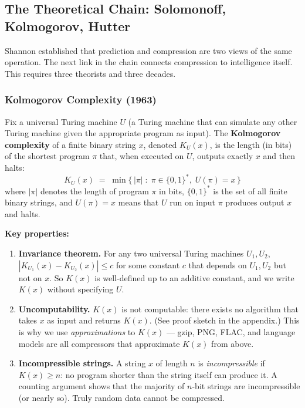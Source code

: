 \documentclass[11pt, a4paper]{article}
\begin{document}
\subsection{The Theoretical Chain: Solomonoff, Kolmogorov, Hutter}

Shannon established that prediction and compression are two views of the
same operation. The next link in the chain connects compression to
intelligence itself. This requires three theorists and three decades.

\subsubsection{Kolmogorov Complexity (1963)}

\begin{definition}[title={Kolmogorov Complexity}]
Fix a universal Turing machine $U$ (a Turing machine that can simulate
any other Turing machine given the appropriate program as input). The
\textbf{Kolmogorov complexity} of a finite binary string $x$, denoted
$K_U(x)$, is the length (in bits) of the shortest program $\pi$ that,
when executed on $U$, outputs exactly $x$ and then halts:
\[
K_U(x) \;=\; \min\bigl\{\,|\pi| \;:\; \pi \in \{0,1\}^*,\;
U(\pi) = x\,\bigr\}
\]
where $|\pi|$ denotes the length of program $\pi$ in bits, $\{0,1\}^*$
is the set of all finite binary strings, and $U(\pi) = x$ means that
$U$ run on input $\pi$ produces output $x$ and halts.
\end{definition}

\textbf{Key properties:}
\begin{enumerate}[leftmargin=2em]
  \item \textbf{Invariance theorem.} For any two universal Turing machines
    $U_1, U_2$, $|K_{U_1}(x) - K_{U_2}(x)| \leq c$ for some constant $c$
    that depends on $U_1, U_2$ but not on $x$. So $K(x)$ is well-defined
    up to an additive constant, and we write $K(x)$ without specifying $U$.

  \item \textbf{Uncomputability.} $K(x)$ is not computable: there exists
    no algorithm that takes $x$ as input and returns $K(x)$. (See proof
    sketch in the appendix.) This is why we use \emph{approximations} to
    $K(x)$ --- gzip, PNG, FLAC, and language models are all compressors
    that approximate $K(x)$ from above.

  \item \textbf{Incompressible strings.} A string $x$ of length $n$ is
    \emph{incompressible} if $K(x) \geq n$: no program shorter than the
    string itself can produce it. A counting argument shows that the
    majority of $n$-bit strings are incompressible (or nearly so). Truly
    random data cannot be compressed.
\end{enumerate}
\end{document}
